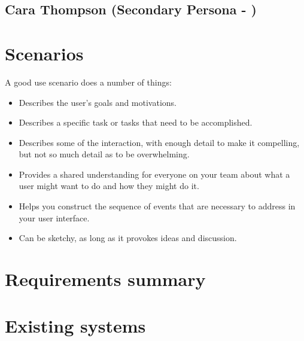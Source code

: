 \subsection{Cara Thompson (Secondary Persona - )}

\section{Scenarios}
 A good use scenario does a number of things:
\begin{itemize}
 \item Describes the user's goals and motivations.
  \item Describes a specific task or tasks that need to be accomplished.
   \item Describes some of the interaction, with enough detail to make it compelling, but not so much detail as to be overwhelming.
    \item Provides a shared understanding for everyone on your team about what a user might want to do and how they might do it.
     \item Helps you construct the sequence of events that are necessary to address in your user interface.
     \item Can be sketchy, as long as it provokes ideas and discussion.
\end{itemize}

\section{Requirements summary}

\section{Existing systems}
